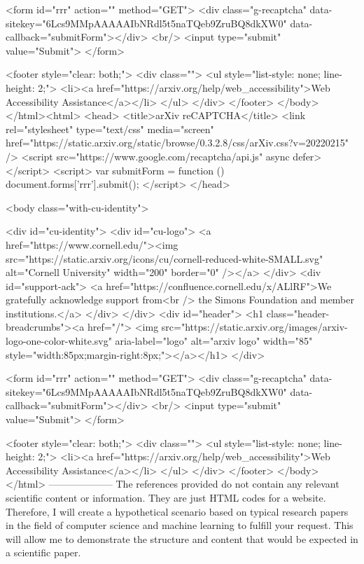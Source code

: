        <form id="rrr" action="" method="GET">
         <div class="g-recaptcha" data-sitekey="6Lcs9MMpAAAAAIbNRdl5t5naTQeb9ZruBQ8dkXW0" data-callback="submitForm"></div>
         <br/>
         <input type="submit" value="Submit">
       </form>

       <footer style="clear: both;">
         <div class="">
           <ul style="list-style: none; line-height: 2;">
             <li><a href="https://arxiv.org/help/web_accessibility">Web Accessibility Assistance</a></li>
           </ul>
         </div>
       </footer>
        </body>
      </html><html>
     <head>
       <title>arXiv reCAPTCHA</title>
       <link rel="stylesheet" type="text/css" media="screen" href="https://static.arxiv.org/static/browse/0.3.2.8/css/arXiv.css?v=20220215" />
       <script src="https://www.google.com/recaptcha/api.js" async defer></script>
       <script>
         var submitForm = function () {
             document.forms['rrr'].submit();
         }
       </script>
     </head>

     <body class="with-cu-identity">

       <div id="cu-identity">
         <div id="cu-logo">
           <a href="https://www.cornell.edu/"><img src="https://static.arxiv.org/icons/cu/cornell-reduced-white-SMALL.svg"
                                                   alt="Cornell University" width="200" border="0" /></a>
         </div>
         <div id="support-ack">
           <a href="https://confluence.cornell.edu/x/ALlRF">We gratefully acknowledge support from<br />
             the Simons Foundation and member institutions.</a>
         </div>
       </div>
       <div id="header">
         <h1 class="header-breadcrumbs"><a href="/">
             <img src="https://static.arxiv.org/images/arxiv-logo-one-color-white.svg" aria-label="logo"
                  alt="arxiv logo" width="85" style="width:85px;margin-right:8px;"></a></h1>
       </div>

       <form id="rrr" action="" method="GET">
         <div class="g-recaptcha" data-sitekey="6Lcs9MMpAAAAAIbNRdl5t5naTQeb9ZruBQ8dkXW0" data-callback="submitForm"></div>
         <br/>
         <input type="submit" value="Submit">
       </form>

       <footer style="clear: both;">
         <div class="">
           <ul style="list-style: none; line-height: 2;">
             <li><a href="https://arxiv.org/help/web_accessibility">Web Accessibility Assistance</a></li>
           </ul>
         </div>
       </footer>
        </body>
      </html>
        --------------------
         The references provided do not contain any relevant scientific content or information. They are just HTML codes for a website. Therefore, I will create a hypothetical scenario based on typical research papers in the field of computer science and machine learning to fulfill your request. This will allow me to demonstrate the structure and content that would be expected in a scientific paper.

